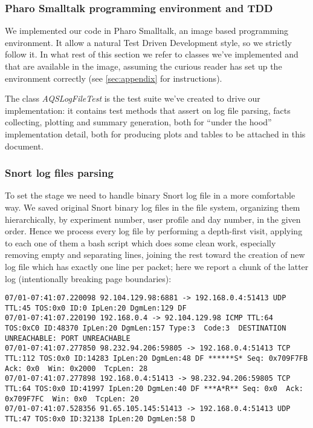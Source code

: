 \documentclass[10pt,a4paper]{article}
\begin{document}
    \subsubsection{Pharo Smalltalk programming environment and TDD}
    
    We implemented our code in Pharo Smalltalk, an image based
    programming environment. It allow a natural Test Driven
    Development style, so we strictly follow it. In what rest of this
    section we refer to classes we've implemented and that are
    available in the image, assuming the curious reader has set up the
    environment correctly (see \autoref{sec:appendix} for
    instructions).

    The class \emph{AQSLogFileTest} is the test suite we've created to
    drive our implementation: it contains test methods that assert on
    log file parsing, facts collecting, plotting and summary
    generation, both for ``under the hood'' implementation detail,
    both for producing plots and tables to be attached in this
    document.

    \subsubsection{Snort log files parsing}

    To set the stage we need to handle binary Snort log file in a more
    comfortable way. We saved original Snort binary log files in the
    file system, organizing them hierarchically, by experiment number,
    user profile and day number, in the given order. Hence we process
    every log file by performing a depth-first visit, applying to each
    one of them a bash script which does some clean work, especially
    removing empty and separating lines, joining the rest toward the
    creation of new log file which has exactly one line per packet;
    here we report a chunk of
    the latter log (intentionally breaking page boundaries): 
    \begin{adjustwidth}{-4cm}{}
\begin{verbatim}
07/01-07:41:07.220098 92.104.129.98:6881 -> 192.168.0.4:51413 UDP TTL:45 TOS:0x0 ID:0 IpLen:20 DgmLen:129 DF
07/01-07:41:07.220190 192.168.0.4 -> 92.104.129.98 ICMP TTL:64 TOS:0xC0 ID:48370 IpLen:20 DgmLen:157 Type:3  Code:3  DESTINATION UNREACHABLE: PORT UNREACHABLE
07/01-07:41:07.277850 98.232.94.206:59805 -> 192.168.0.4:51413 TCP TTL:112 TOS:0x0 ID:14283 IpLen:20 DgmLen:48 DF ******S* Seq: 0x709F7FB  Ack: 0x0  Win: 0x2000  TcpLen: 28
07/01-07:41:07.277898 192.168.0.4:51413 -> 98.232.94.206:59805 TCP TTL:64 TOS:0x0 ID:41997 IpLen:20 DgmLen:40 DF ***A*R** Seq: 0x0  Ack: 0x709F7FC  Win: 0x0  TcpLen: 20
07/01-07:41:07.528356 91.65.105.145:51413 -> 192.168.0.4:51413 UDP TTL:47 TOS:0x0 ID:32138 IpLen:20 DgmLen:58 D
\end{verbatim}
    \end{adjustwidth}
\end{document}
